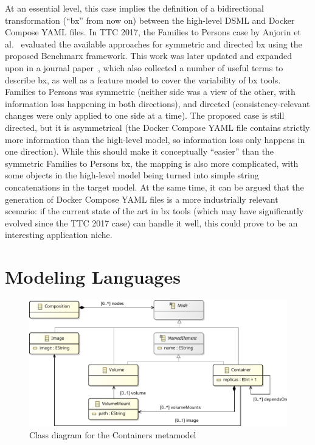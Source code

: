\documentclass[sigconf,review]{acmart}
\begin{document}
At an essential level, this case implies the definition of a bidirectional
transformation (``bx'' from now on) between the high-level DSML and Docker
Compose YAML files. In TTC 2017, the Families to Persons case by Anjorin et
al.~\cite{anjorin_families_2017} evaluated the available approaches for
symmetric and directed bx using the proposed Benchmarx framework. This work was
later updated and expanded upon in a journal
paper~\cite{anjorin_benchmarking_2020}, which also collected a number of useful
terms to describe bx, as well as a feature model to cover the variability of bx
tools. Families to Persons was symmetric (neither side was a view of the other,
with information loss happening in both directions), and directed
(consistency-relevant changes were only applied to one side at a time). The
proposed case is still directed, but it is asymmetrical (the Docker Compose YAML
file contains strictly more information than the high-level model, so
information loss only happens in one direction). While this should make it
conceptually ``easier'' than the symmetric Families to Persons bx, the mapping
is also more complicated, with some objects in the high-level model being turned
into simple string concatenations in the target model. At the same time, it can
be argued that the generation of Docker Compose YAML files is a more
industrially relevant scenario: if the current state of the art in bx tools
(which may have significantly evolved since the TTC 2017 case) can handle it
well, this could prove to be an interesting application niche.

\section{Modeling Languages}

\begin{figure}
  \centering
  \includegraphics[width=\columnwidth]{containers-metamodel}
  \caption{Class diagram for the Containers metamodel}%
  \label{fig:containers-metamodel}
\end{figure}
\end{document}
